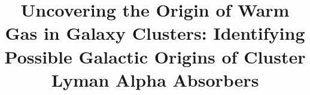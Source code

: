 %
%
%
%






%
%

\title{Uncovering the Origin of Warm Gas in Galaxy Clusters: Identifying Possible
       Galactic Origins of Cluster Lyman Alpha Absorbers}

%
%
%

\begin{PI}
\end{PI}

\begin{CoI}
\end{CoI}

\begin{CoI}
\end{CoI}

